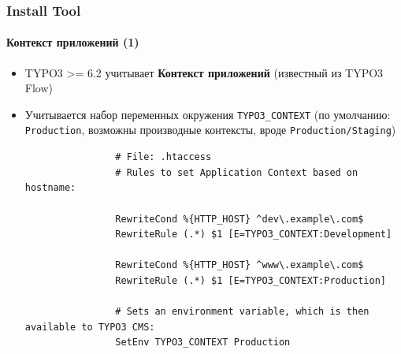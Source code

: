 
\begin{frame}[fragile]
	\frametitle{Install Tool}
	\framesubtitle{Контекст приложений (1)}

	\begin{itemize}
		\item TYPO3 >= 6.2 учитывает \textbf{Контекст приложений}\newline
			\smaller(известный из TYPO3 Flow)\normalsize
		\item Учитывается набор переменных окружения \texttt{TYPO3\_CONTEXT}\newline
			\smaller(по умолчанию: \texttt{Production}, возможны производные контексты, вроде \texttt{Production/Staging})
			\normalsize

			\begin{lstlisting}
				# File: .htaccess
				# Rules to set Application Context based on hostname:

				RewriteCond %{HTTP_HOST} ^dev\.example\.com$
				RewriteRule (.*) $1 [E=TYPO3_CONTEXT:Development]

				RewriteCond %{HTTP_HOST} ^www\.example\.com$
				RewriteRule (.*) $1 [E=TYPO3_CONTEXT:Production]

				# Sets an environment variable, which is then available to TYPO3 CMS:
				SetEnv TYPO3_CONTEXT Production
			\end{lstlisting}

	\end{itemize}

\end{frame}



